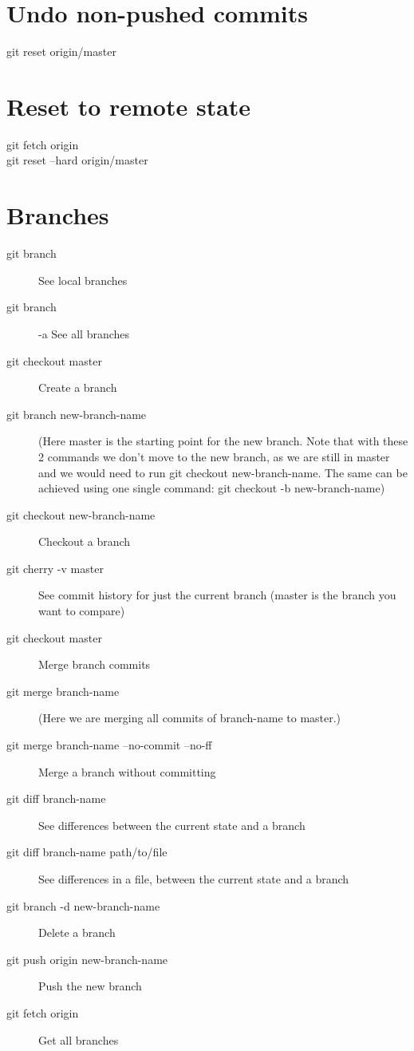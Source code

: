 \documentclass{article}
\begin{document}
\section{Undo \textcolor{bred}{non-pushed commits}}
\begin{description}
    \item [git reset origin/master]
\end{description}

\section{Reset to remote state}
\begin{description}
    \item [git fetch origin]
    \item [git reset --hard origin/master]
\end{description}

\section{Branches}
\begin{description}
    \item [git branch] See local branches
    \item [git branch] -a See all branches
    \item [git checkout master]
        Create a branch
    \item [git branch new-branch-name]
        (Here master is the starting point for the new branch. Note that with these 2
        commands we don't move to the new branch, as we are still in master and we
        would need to run git checkout new-branch-name. The same can be achieved using
        one single command: git checkout -b new-branch-name)
    \item [git checkout new-branch-name]
        Checkout a branch
    \item [git cherry -v master]
        See commit history for just the current branch
        (master is the branch you want to compare)
    \item [git checkout master]
        Merge branch commits
    \item [git merge branch-name]
        (Here we are merging all commits of branch-name to master.)
    \item [git merge branch-name --no-commit --no-ff]
        Merge a branch without committing
    \item [git diff branch-name]
        See differences between the current state and a branch
    \item [git diff branch-name path/to/file]
        See differences in a file, between the current state and a branch
    \item [git branch -d new-branch-name]
        Delete a branch
    \item [git push origin new-branch-name]
        Push the new branch
    \item [git fetch origin]
        Get all branches
\end{description}
\end{document}

